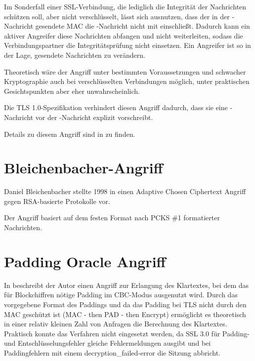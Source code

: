 Im Sonderfall einer SSL-Verbindung, die lediglich die Integrität der Nachrichten schützen soll, aber nicht verschlüsselt, lässt sich ausnutzen, dass der in der \finished{}-Nachricht gesendete MAC die \changecipherspec{}-Nachricht nicht mit einschließt. Dadurch kann ein aktiver Angreifer diese Nachrichten abfangen und nicht weiterleiten, sodass die Verbindungspartner die Integritätsprüfung nicht einsetzen. Ein Angreifer ist so in der Lage, gesendete Nachrichten zu verändern. 

Theoretisch wäre der Angriff unter bestimmten Voraussetzungen und schwacher Kryptographie auch bei verschlüsselten Verbindungen möglich, unter praktischen Gesichtspunkten aber eher unwahrscheinlich.

Die TLS 1.0-Spezifikation verhindert diesen Angriff dadurch, dass sie eine \changecipherspec{}-Nachricht vor der \finished{}-Nachricht explizit vorschreibt.

Details zu diesem Angriff sind in \cite{wagner96} zu finden.


\section{Bleichenbacher-Angriff}

Daniel Bleichenbacher stellte 1998 in \cite{bleichenbacher98} einen Adaptive Chosen Ciphertext Angriff gegen RSA-basierte Protokolle vor.

Der Angriff basiert auf dem festen Format nach PCKS \#1 formatierter Nachrichten. 

\section{Padding Oracle Angriff}

In \cite{vaudenay02} beschreibt der Autor einen Angriff zur Erlangung des Klartextes, bei dem das für Blockchiffren nötige Padding im CBC-Modus ausgenutzt wird. Durch das vorgegebene Format des Paddings und da das Padding bei TLS nicht durch den MAC geschützt ist (MAC - then PAD - then Encrypt) ermöglicht es theoretisch in einer relativ kleinen Zahl von Anfragen die Berechnung des Klartextes. Praktisch konnte das Verfahren nicht eingesetzt werden, da SSL 3.0 für Padding- und Entschlüsselungsfehler gleiche Fehlermeldungen ausgibt  und bei Paddingfehlern mit einem decryption\_failed-error die Sitzung abbricht.

